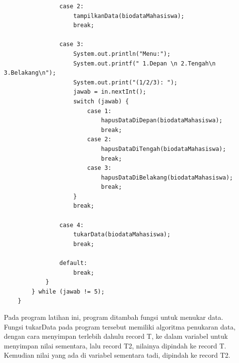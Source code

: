 \documentclass[a4paper,12pt]{article}
\begin{document}
\begin{lstlisting}
                case 2:
                    tampilkanData(biodataMahasiswa);
                    break;

                case 3:
                    System.out.println("Menu:");
                    System.out.printf(" 1.Depan \n 2.Tengah\n 3.Belakang\n");
                    System.out.print("(1/2/3): ");
                    jawab = in.nextInt();
                    switch (jawab) {
                        case 1:
                            hapusDataDiDepan(biodataMahasiswa);
                            break;
                        case 2:
                            hapusDataDiTengah(biodataMahasiswa);
                            break;
                        case 3:
                            hapusDataDiBelakang(biodataMahasiswa);
                            break;
                    }
                    break;

                case 4:
                    tukarData(biodataMahasiswa);
                    break;

                default:
                    break;
            }
        } while (jawab != 5);
    }
\end{lstlisting}
Pada program latihan ini, program ditambah fungsi untuk menukar data.\\
Fungsi tukarData pada program tersebut memiliki algoritma penukaran data,
dengan cara menyimpan terlebih dahulu record T, ke dalam variabel untuk
menyimpan nilai sementara, lalu record T2, nilainya dipindah ke record T.
Kemudian nilai yang ada di variabel sementara tadi, dipindah ke record T2.
\end{document}
